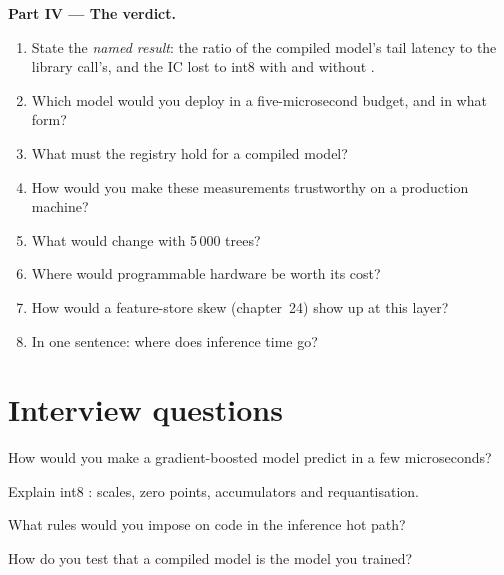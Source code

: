 \begin{problem}
\medskip\noindent\textbf{Part IV --- The verdict.}
\begin{enumerate}[resume]
\item State the \emph{named result}: the ratio of the compiled model's tail latency to the library call's, and the IC lost to
int8  with and without .
\item Which model would you deploy in a five-microsecond budget, and in what form?
\item What must the registry hold for a compiled model?
\item How would you make these measurements trustworthy on a production machine?
\item What would change with 5\,000 trees?
\item Where would programmable hardware be worth its cost?
\item How would a feature-store skew (chapter~24) show up at this layer?
\item In one sentence: where does inference time go?
\end{enumerate}
\end{problem}

\section{Interview questions}

\begin{interviewq}\label{iq:ml:low-latency-inference:1}
How would you make a gradient-boosted model predict in a few microseconds?
\end{interviewq}

\begin{interviewq}\label{iq:ml:low-latency-inference:2}
Explain int8 : scales, zero points, accumulators and requantisation.
\end{interviewq}

\begin{interviewq}\label{iq:ml:low-latency-inference:3}
What rules would you impose on code in the inference hot path?
\end{interviewq}

\begin{interviewq}\label{iq:ml:low-latency-inference:4}
How do you test that a compiled model is the model you trained?
\end{interviewq}

